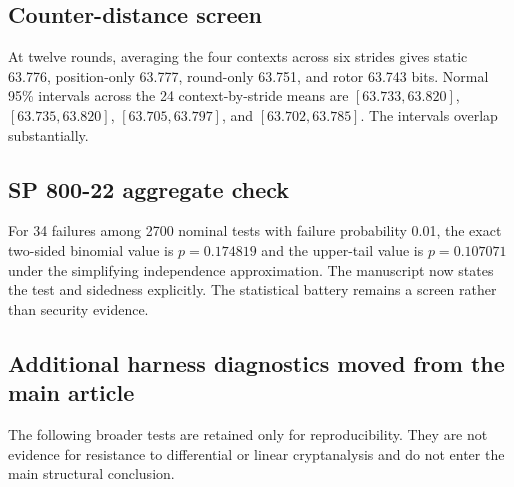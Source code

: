 \documentclass[cryptography,supfile,submit,oneauthor]{Definitions/mdpi}
\begin{document}
\subsection{Counter-distance screen}
At twelve rounds, averaging the four contexts across six strides gives static 63.776, position-only 63.777, round-only 63.751, and rotor 63.743 bits. Normal 95\% intervals across the 24 context-by-stride means are $[63.733,63.820]$, $[63.735,63.820]$, $[63.705,63.797]$, and $[63.702,63.785]$. The intervals overlap substantially.

\subsection{SP 800-22 aggregate check}
For 34 failures among 2700 nominal tests with failure probability 0.01, the exact two-sided binomial value is $p=0.174819$ and the upper-tail value is $p=0.107071$ under the simplifying independence approximation. The manuscript now states the test and sidedness explicitly. The statistical battery remains a screen rather than security evidence.


\subsection{Additional harness diagnostics moved from the main article}
The following broader tests are retained only for reproducibility. They are not evidence for resistance to differential or linear cryptanalysis and do not enter the main structural conclusion.
\end{document}
